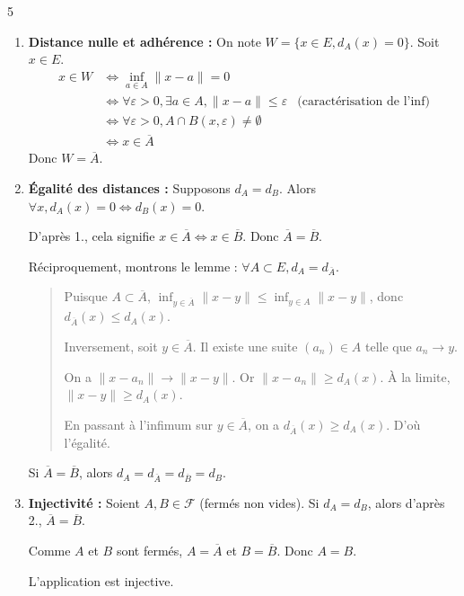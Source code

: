 \begin{correction}{5}
\begin{enumerate}
    \item \textbf{Distance nulle et adhérence :}
        On note $W = \{x \in E, d_{A}(x) = 0\}$.
        Soit $x \in E$.
        \begin{align*}
            x \in W &\iff \inf_{a \in A} \|x-a\| = 0  \\
            &\iff \forall \varepsilon > 0, \exists a \in A, \|x-a\| \leqslant \varepsilon &\text{(caractérisation de l'inf)} \\
            &\iff \forall \varepsilon > 0, A \cap B(x, \varepsilon) \neq \emptyset \\
            &\iff x \in \overline{A}
        \end{align*}
        Donc $W = \overline{A}$.

    \item \textbf{Égalité des distances :}
        Supposons $d_{A} = d_{B}$.
        Alors $\forall x, d_{A}(x)=0 \iff d_{B}(x)=0$.

        D'après 1., cela signifie $x \in \overline{A} \iff x \in \overline{B}$. Donc $\overline{A} = \overline{B}$.

        Réciproquement, montrons le lemme : $\forall A \subset E, d_{A} = d_{\overline{A}}$.
        \begin{quote}
            Puisque $A \subset \overline{A}$, $\inf_{y \in \overline{A}} \|x-y\| \leqslant \inf_{y \in A} \|x-y\|$, donc $d_{\overline{A}}(x) \leqslant d_{A}(x)$.

            Inversement, soit $y \in \overline{A}$. Il existe une suite $(a_{n}) \in A$ telle que $a_{n} \to y$.

            On a $\|x-a_{n}\| \to \|x-y\|$.
            Or $\|x-a_{n}\| \geqslant d_{A}(x)$. À la limite, $\|x-y\| \geqslant d_{A}(x)$.

            En passant à l'infimum sur $y \in \overline{A}$, on a $d_{\overline{A}}(x) \geqslant d_{A}(x)$.
            D'où l'égalité.
        \end{quote}
        Si $\overline{A} = \overline{B}$, alors $d_{A} = d_{\overline{A}} = d_{\overline{B}} = d_{B}$.

    \item \textbf{Injectivité :}
        Soient $A, B \in \mathcal{F}$ (fermés non vides).
        Si $d_{A} = d_{B}$, alors d'après 2., $\overline{A} = \overline{B}$.

        Comme $A$ et $B$ sont fermés, $A = \overline{A}$ et $B = \overline{B}$.
        Donc $A = B$.

        L'application est injective.
\end{enumerate}
\end{correction}


